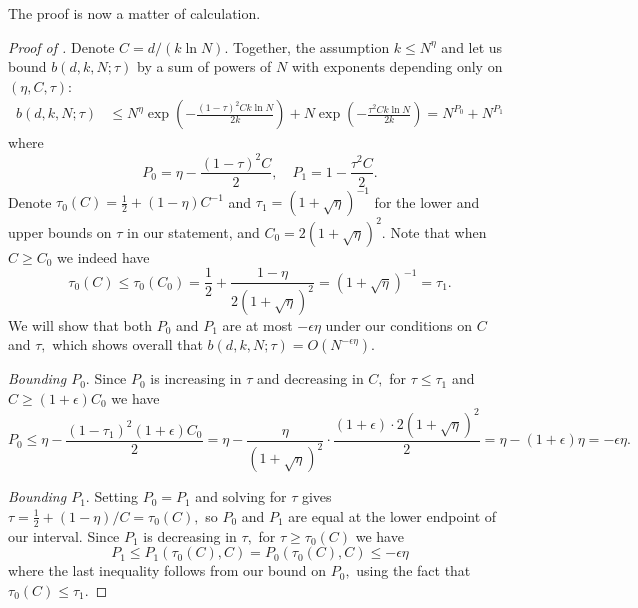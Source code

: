 The proof is now a matter of calculation.

\begin{proof}[Proof of ]
Denote $C = d /(k \ln N).$ Together, the assumption $k \le N^\eta$ and  let us bound $b(d, k, N; \tau)$ by a sum of powers of $N$ with exponents depending only on $(\eta, C, \tau)$:
\begin{align*}
b(d, k, N; \tau) &\le N^\eta \exp\left(- \frac{(1 - \tau)^2 C k \ln N}{2k} \right) + N \exp\left(- \frac{\tau^2 C k \ln N}{2k} \right) =  N^{P_0} + N^{P_1}
\end{align*}
where
$$
P_0 = \eta - \frac{(1 - \tau)^2 C}{2}, \quad P_1 = 1 - \frac{\tau^2 C}{2}.
$$
Denote $\tau_0(C) = \frac 1 2 + (1 - \eta) C^{-1}$ and $\tau_1 = (1 + \sqrt \eta)^{-1}$ for the lower and upper bounds on $\tau$ in our statement, and $C_0 = 2 (1 + \sqrt \eta)^2.$ Note that when $C \ge C_0$ we indeed have
$$
\tau_0(C) \le \tau_0(C_0) = \frac 1 2 + \frac{1 - \eta}{2 (1 + \sqrt \eta)^2} = (1 + \sqrt \eta)^{-1} = \tau_1.
$$
We will show that both $P_0$ and $P_1$ are at most $-\epsilon \eta$ under our conditions on $C$ and $\tau,$ which shows overall that $b(d, k, N; \tau) = O(N^{-\epsilon \eta}).$

\textit{Bounding $P_0.$} Since $P_0$ is increasing in $\tau$ and decreasing in $C,$ for $\tau \le \tau_1$ and $C \ge (1 + \epsilon) C_0$ we have
$$
P_0 \le \eta - \frac{(1 - \tau_1)^2 (1 + \epsilon) C_0}{2} = \eta - \frac{\eta}{(1 + \sqrt \eta)^2} \cdot \frac{(1 + \epsilon) \cdot 2(1 + \sqrt \eta)^2}{2} = \eta - (1 + \epsilon) \eta = -\epsilon \eta.
$$

\textit{Bounding $P_1.$} Setting $P_0 = P_1$ and solving for $\tau$ gives $\tau = \frac 1 2 + (1 - \eta)/C = \tau_0(C),$ so $P_0$ and $P_1$ are equal at the lower endpoint of our interval. Since $P_1$ is decreasing in $\tau,$ for $\tau \ge \tau_0(C)$ we have
$$
P_1 \le P_1(\tau_0(C), C) = P_0(\tau_0(C), C) \le -\epsilon \eta
$$
where the last inequality follows from our bound on $P_0,$ using the fact that $\tau_0(C) \le \tau_1.$
\end{proof}
